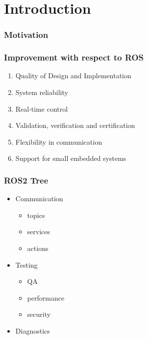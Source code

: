 \part{Introduction}

  \section{Motivation}

  \section{Improvement with respect to ROS}

    \begin{enumerate}
      \item Quality of Design and Implementation
      \item System reliability
      \item Real-time control
      \item Validation, verification and certification
      \item Flexibility in communication
      \item Support for small embedded systems
    \end{enumerate}


  \section{ROS2 Tree}

    \begin{itemize}
      \item Communication
        \begin{itemize}
          \item topics
          \item services
          \item actions
        \end{itemize}

      \item Testing
        \begin{itemize}
          \item QA
          \item performance
          \item security
        \end{itemize}

        \item Diagnostics

    \end{itemize}
  
  

  
            